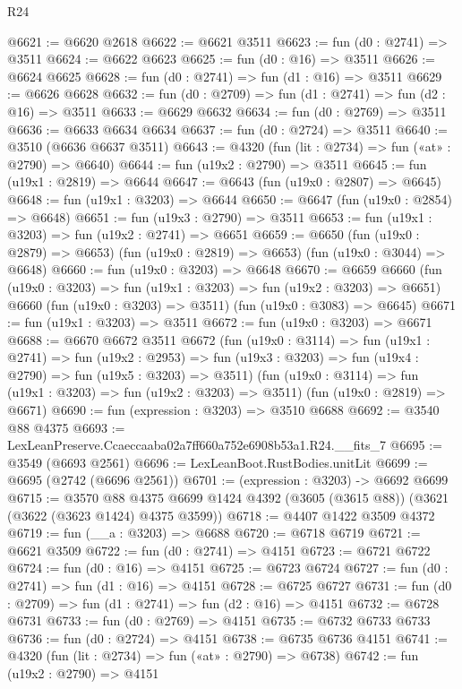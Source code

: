 \begin{lexlean}{R24}
\begin{coremodule}
@6621 := @6620 @2618
@6622 := @6621 @3511
@6623 := fun (d0 : @2741) => @3511
@6624 := @6622 @6623
@6625 := fun (d0 : @16) => @3511
@6626 := @6624 @6625
@6628 := fun (d0 : @2741) => fun (d1 : @16) => @3511
@6629 := @6626 @6628
@6632 := fun (d0 : @2709) => fun (d1 : @2741) => fun (d2 : @16) => @3511
@6633 := @6629 @6632
@6634 := fun (d0 : @2769) => @3511
@6636 := @6633 @6634 @6634
@6637 := fun (d0 : @2724) => @3511
@6640 := @3510 (@6636 @6637 @3511)
@6643 := @4320 (fun (lit : @2734) => fun («at» : @2790) => @6640)
@6644 := fun (u19x2 : @2790) => @3511
@6645 := fun (u19x1 : @2819) => @6644
@6647 := @6643 (fun (u19x0 : @2807) => @6645)
@6648 := fun (u19x1 : @3203) => @6644
@6650 := @6647 (fun (u19x0 : @2854) => @6648)
@6651 := fun (u19x3 : @2790) => @3511
@6653 := fun (u19x1 : @3203) => fun (u19x2 : @2741) => @6651
@6659 := @6650
    (fun (u19x0 : @2879) => @6653)
    (fun (u19x0 : @2819) => @6653)
    (fun (u19x0 : @3044) => @6648)
@6660 := fun (u19x0 : @3203) => @6648
@6670 := @6659
    @6660
    (fun (u19x0 : @3203) => fun (u19x1 : @3203) => fun (u19x2 : @3203) => @6651)
    @6660
    (fun (u19x0 : @3203) => @3511)
    (fun (u19x0 : @3083) => @6645)
@6671 := fun (u19x1 : @3203) => @3511
@6672 := fun (u19x0 : @3203) => @6671
@6688 := @6670
    @6672
    @3511
    @6672
    (fun (u19x0 : @3114) =>
    fun (u19x1 : @2741) =>
    fun (u19x2 : @2953) =>
    fun (u19x3 : @3203) => fun (u19x4 : @2790) => fun (u19x5 : @3203) => @3511)
    (fun (u19x0 : @3114) => fun (u19x1 : @3203) => fun (u19x2 : @3203) => @3511)
    (fun (u19x0 : @2819) => @6671)
@6690 := fun (expression : @3203) => @3510 @6688
@6692 := @3540 @88 @4375
@6693 := LexLeanPreserve.Ccaeccaaba02a7ff660a752e6908b53a1.R24.__fits_7
@6695 := @3549 (@6693 @2561)
@6696 := LexLeanBoot.RustBodies.unitLit
@6699 := @6695 (@2742 (@6696 @2561))
@6701 := (expression : @3203) -> @6692 @6699
@6715 := @3570
    @88
    @4375
    @6699
    @1424
    @4392
    (@3605 (@3615 @88))
    (@3621 (@3622 (@3623 @1424) @4375 @3599))
@6718 := @4407 @1422 @3509 @4372
@6719 := fun (__a : @3203) => @6688
@6720 := @6718 @6719
@6721 := @6621 @3509
@6722 := fun (d0 : @2741) => @4151
@6723 := @6721 @6722
@6724 := fun (d0 : @16) => @4151
@6725 := @6723 @6724
@6727 := fun (d0 : @2741) => fun (d1 : @16) => @4151
@6728 := @6725 @6727
@6731 := fun (d0 : @2709) => fun (d1 : @2741) => fun (d2 : @16) => @4151
@6732 := @6728 @6731
@6733 := fun (d0 : @2769) => @4151
@6735 := @6732 @6733 @6733
@6736 := fun (d0 : @2724) => @4151
@6738 := @6735 @6736 @4151
@6741 := @4320 (fun (lit : @2734) => fun («at» : @2790) => @6738)
@6742 := fun (u19x2 : @2790) => @4151

\end{coremodule}
\end{lexlean}
